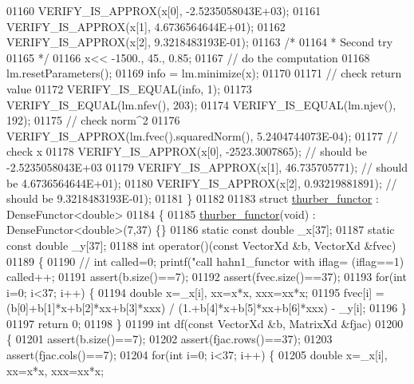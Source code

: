 \begin{DoxyCode}
01160   VERIFY\_IS\_APPROX(x[0], -2.5235058043E+03);
01161   VERIFY\_IS\_APPROX(x[1], 4.6736564644E+01);
01162   VERIFY\_IS\_APPROX(x[2], 9.3218483193E-01);
01163   \textcolor{comment}{/*}
01164 \textcolor{comment}{   * Second try}
01165 \textcolor{comment}{   */}
01166   x<< -1500., 45., 0.85;
01167   \textcolor{comment}{// do the computation}
01168   lm.resetParameters();
01169   info = lm.minimize(x);
01170 
01171   \textcolor{comment}{// check return value}
01172   VERIFY\_IS\_EQUAL(info, 1);
01173   VERIFY\_IS\_EQUAL(lm.nfev(), 203);
01174   VERIFY\_IS\_EQUAL(lm.njev(), 192);
01175   \textcolor{comment}{// check norm^2}
01176   VERIFY\_IS\_APPROX(lm.fvec().squaredNorm(), 5.2404744073E-04);
01177   \textcolor{comment}{// check x}
01178   VERIFY\_IS\_APPROX(x[0], -2523.3007865); \textcolor{comment}{// should be -2.5235058043E+03}
01179   VERIFY\_IS\_APPROX(x[1], 46.735705771); \textcolor{comment}{// should be 4.6736564644E+01);}
01180   VERIFY\_IS\_APPROX(x[2], 0.93219881891); \textcolor{comment}{// should be 9.3218483193E-01);}
01181 \}
01182 
01183 \textcolor{keyword}{struct }\hyperlink{structthurber__functor}{thurber\_functor} : DenseFunctor<double>
01184 \{
01185     \hyperlink{structthurber__functor}{thurber\_functor}(\textcolor{keywordtype}{void}) : DenseFunctor<double>(7,37) \{\}
01186     \textcolor{keyword}{static} \textcolor{keyword}{const} \textcolor{keywordtype}{double} \_x[37];
01187     \textcolor{keyword}{static} \textcolor{keyword}{const} \textcolor{keywordtype}{double} \_y[37];
01188     \textcolor{keywordtype}{int} operator()(\textcolor{keyword}{const} VectorXd &b, VectorXd &fvec)
01189     \{
01190         \textcolor{comment}{//        int called=0; printf("call hahn1\_functor with  iflag=%
       (iflag==1) called++;}
01191         assert(b.size()==7);
01192         assert(fvec.size()==37);
01193         \textcolor{keywordflow}{for}(\textcolor{keywordtype}{int} i=0; i<37; i++) \{
01194             \textcolor{keywordtype}{double} x=\_x[i], xx=x*x, xxx=xx*x;
01195             fvec[i] = (b[0]+b[1]*x+b[2]*xx+b[3]*xxx) / (1.+b[4]*x+b[5]*xx+b[6]*xxx) - \_y[i];
01196         \}
01197         \textcolor{keywordflow}{return} 0;
01198     \}
01199     \textcolor{keywordtype}{int} df(\textcolor{keyword}{const} VectorXd &b, MatrixXd &fjac)
01200     \{
01201         assert(b.size()==7);
01202         assert(fjac.rows()==37);
01203         assert(fjac.cols()==7);
01204         \textcolor{keywordflow}{for}(\textcolor{keywordtype}{int} i=0; i<37; i++) \{
01205             \textcolor{keywordtype}{double} x=\_x[i], xx=x*x, xxx=xx*x;

\end{DoxyCode}
